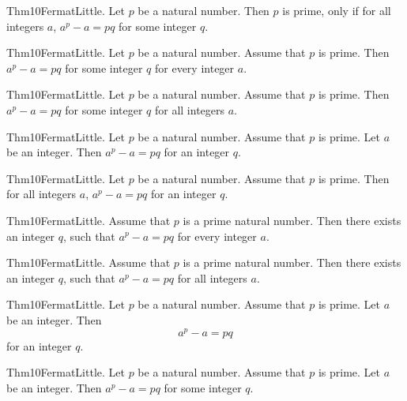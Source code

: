 \documentclass{article}
\begin{document}
Thm10FermatLittle. Let $p$ be a natural number. Then $p$ is prime, only if for all integers $a$, $a ^ {p}- a = p q$ for some integer $q$.

Thm10FermatLittle. Let $p$ be a natural number. Assume that $p$ is prime. Then $a ^ {p}- a = p q$ for some integer $q$ for every integer $a$.

Thm10FermatLittle. Let $p$ be a natural number. Assume that $p$ is prime. Then $a ^ {p}- a = p q$ for some integer $q$ for all integers $a$.

Thm10FermatLittle. Let $p$ be a natural number. Assume that $p$ is prime. Let $a$ be an integer. Then $a ^ {p}- a = p q$ for an integer $q$.

Thm10FermatLittle. Let $p$ be a natural number. Assume that $p$ is prime. Then for all integers $a$, $a ^ {p}- a = p q$ for an integer $q$.

Thm10FermatLittle. Assume that $p$ is a prime natural number. Then there exists an integer $q$, such that $a ^ {p}- a = p q$ for every integer $a$.

Thm10FermatLittle. Assume that $p$ is a prime natural number. Then there exists an integer $q$, such that $a ^ {p}- a = p q$ for all integers $a$.

Thm10FermatLittle. Let $p$ be a natural number. Assume that $p$ is prime. Let $a$ be an integer. Then $$a ^ {p}- a = p q$$ for an integer $q$.

Thm10FermatLittle. Let $p$ be a natural number. Assume that $p$ is prime. Let $a$ be an integer. Then $a ^ {p}- a = p q$ for some integer $q$.
\end{document}
